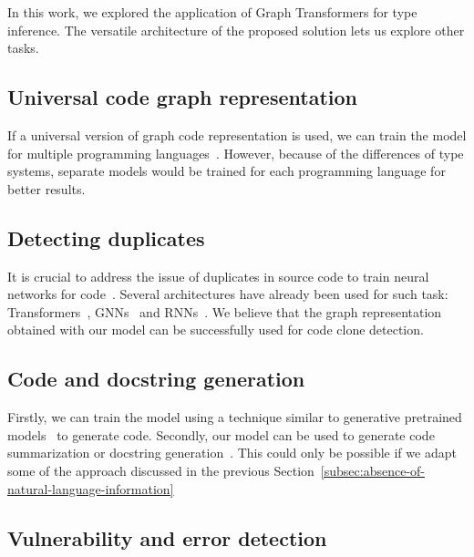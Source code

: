 In this work, we explored the application of Graph Transformers for type inference.
The versatile architecture of the proposed solution lets us explore other tasks.

\subsection{Universal code graph representation}\label{subsec:universal-code-graph-representation}

If a universal version of graph code representation is used, we can train the model for multiple programming languages~\cite{wang_unified_2022}.
However, because of the differences of type systems, separate models would be trained for each programming language for better results.

\subsection{Detecting duplicates}\label{subsec:detecting-duplicates}

It is crucial to address the issue of duplicates in source code to train neural networks for code~\cite{allamanis2020typilus,mir_type4py_2021}.
Several architectures have already been used for such task: Transformers~\cite{zhang2023efficient}, GNNs~\cite{wang_detecting_2020} and RNNs~\cite{yasaswi2017plagiarism}.
We believe that the graph representation obtained with our model can be successfully used for code clone detection.

\subsection{Code and docstring generation}\label{subsec:code-generation}

Firstly, we can train the model using a technique similar to generative pretrained models~\cite{radford_language_2019,brown_language_2020} to generate code.
Secondly, our model can be used to generate code summarization or docstring generation~\cite{barone_parallel_2017,liu_haconvgnn_2021}.
This could only be possible if we adapt some of the approach discussed in the previous Section~\ref{subsec:absence-of-natural-language-information}

\subsection{Vulnerability and error detection}\label{subsec:vulnerability-and-error-detection}

